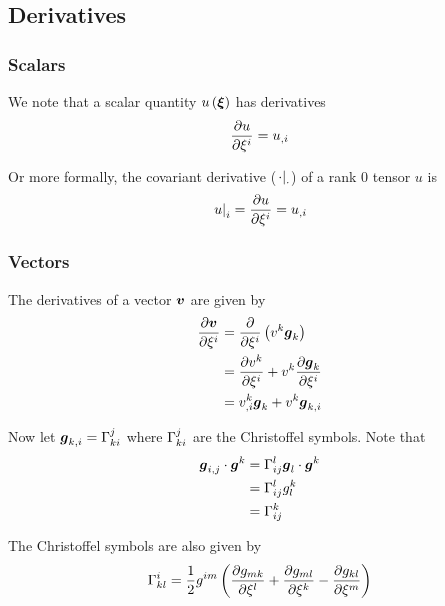 \subsection{Derivatives}

\subsubsection{Scalars}

We note that a scalar quantity $\fnof{u}{\vect{\xi}}$ has derivatives
\begin{equation}
   \dfrac{\partial u}{\partial \xi^{i}} =u_{,i}
\end{equation}

Or more formally, the covariant derivative ($ \left. \cdot \right|_{\cdot} $) of a
rank 0 tensor $u$ is
\begin{equation}
   \left. u \right|_{i} = \dfrac{\partial u}{\partial \xi^{i}} =u_{,i}
\end{equation}

\subsubsection{Vectors}

The derivatives of a vector $\vect{v}$ are given by
\begin{equation}
  \begin{split}
    \delby{\vect{v}}{\xi^{i}} &=
    \delby{}{\xi^{i}}\pbrac{v^{k}\vect{g}_{k}} \\
    &= \delby{v^{k}}{\xi^{i}}+v^{k}\delby{\vect{g}_{k}}{\xi^{i}} \\
    &= v^{k}_{,i}\vect{g}_{k}+v^{k}\vect{g}_{k,i}
  \end{split}
\end{equation}

Now let $\vect{g}_{k,i}=\christoffel{k}{i}{j}$ where $ \Gamma_{ki}^{j} $ are
the Christoffel symbols. Note that
\begin{equation}
  \begin{split}
    \dotprod{\vect{g}_{i,j}}{\vect{g}^{k}} &=
    \dotprod{\christoffel{i}{j}{l}\vect{g}_{l}}{\vect{g}^{k}} \\
    &= \christoffel{i}{j}{l}g^{k}_{l} \\
    & = \christoffel{i}{j}{k}
  \end{split}
\end{equation}

The Christoffel symbols are also given by
\begin{equation}
   \Gamma_{kl}^{i} =\frac{1}{2}g^{im}\left(  \dfrac{\partial g_{mk}}{\partial \xi^{l}} + \dfrac{\partial g_{ml}}{\partial \xi^{k}} - \dfrac{\partial g_{kl}}{\partial \xi^{m}}  \right)
\end{equation}

